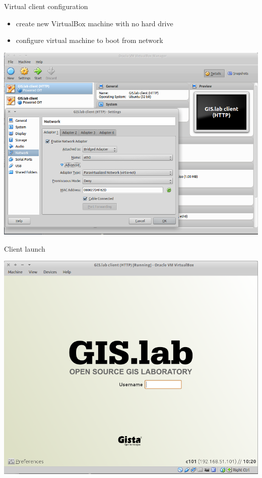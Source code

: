 \documentclass[12pt]{beamer}
\begin{document}
\begin{frame}{Virtual client configuration}
	\begin{itemize}
		\item create new VirtualBox machine with no hard drive
		\item configure virtual machine to boot from network
	\end{itemize}
	\begin{center}
		\includegraphics[keepaspectratio=true,height=0.6\textheight]{images/real-world-example/client-virtualbox-configuration.png}
	\end{center}
\end{frame}


\begin{frame}{Client launch}
	\begin{center}
		\includegraphics[keepaspectratio=true,height=0.7\textheight]{images/real-world-example/client-login.png}
	\end{center}
\end{frame}
\end{document}
